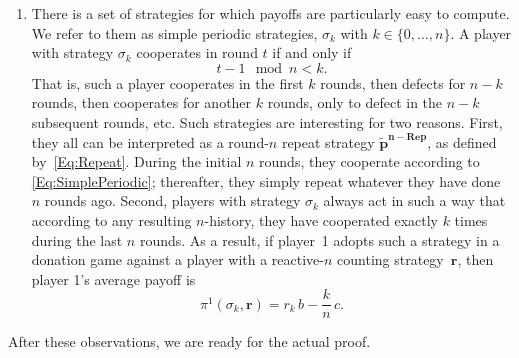 \documentclass[9pt,twoside,lineno]{pnas-new}
\theoremstyle{plainCl1}
\theoremstyle{plainCl2}
\begin{document}
\begin{enumerate}
\item There is a set of strategies for which payoffs are particularly easy to compute. 
We refer to them as simple periodic strategies, $\sigma_{k}$ with $k\!\in\!\{0,\ldots,n\}$. 
A player with strategy $\sigma_{k}$ cooperates in round $t$ if and only if 
\begin{equation} \label{Eq:SimplePeriodic}
t-1\!\!\mod n < k.
\end{equation}
That is, such a player cooperates in the first $k$ rounds, then defects for $n\!-\!k$ rounds, then cooperates for another $k$ rounds, only to defect in the $n\!-\!k$ subsequent rounds, etc. 
Such strategies are interesting for two reasons. 
First, they all can be interpreted as a round-$n$ repeat strategy $\mathbf{\tilde p^{n-\text{Rep}}}$, as defined by~\eqref{Eq:Repeat}.
During the initial $n$ rounds, they cooperate according to \eqref{Eq:SimplePeriodic}; thereafter, they simply repeat whatever they have done $n$ rounds ago. 
Second, players with  strategy $\sigma_{k}$ always act in such a way that according to any resulting $n$-history, they have cooperated exactly $k$ times during the last $n$ rounds. As a result, if player~1 adopts such a strategy in a donation game against a player with a reactive-$n$ counting strategy~$\mathbf{r}$, then player 1's average payoff is 
\begin{equation} \label{Eq:PaySimplePeriodic}
\pi^1(\sigma_{k},\mathbf{r}) = r_k\,b - \frac{k}{n}\,c.
\end{equation}
\end{enumerate}

\noindent
After these observations, we are ready for the actual proof. 
\end{document}
